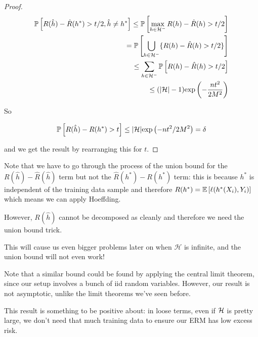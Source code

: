 \documentclass[11pt]{scrartcl}
\begin{document}
\begin{theorem}
\begin{proof}
\begin{align}
    \mathbb{P} \left[ R(\hat{h}) - \hat{R}(h^*) > t/2, \hat{h} \neq h^* \right] \le \mathbb{P} \left[ \max_{h \in \mathcal{H}^-} R(h) - \hat{R}(h) > t/2 \right] \\
    = \mathbb{P} \left[ \bigcup_{h \in \mathcal{H}^-} \{ R(h) - \hat{R}(h) > t/2 \} \right] \\
    \le \sum_{h \in \mathcal{H}^-} \mathbb{P} \left[ R(h) - \hat{R}(h) > t/2 \right] \\
    \le (|\mathcal{H}|-1) \text{exp} \left( -\frac{nt^2}{2M^2} \right)
\end{align}


So

\begin{equation}
    \mathbb{P} \left[ R(\hat{h}) - R(h^*) > t \right] \le |\mathcal{H}| \text{exp} \left( -nt^2 / 2M^2 \right) = \delta
\end{equation}

and we get the result by rearranging this for $t$.
\end{proof}
\label{Finite hypothesis class bound}
\end{theorem}

\begin{arthurnote*}
Note that we have to go through the process of the union bound for the $R(\hat{h})-\hat{R}(\hat{h})$ term but not the $\hat{R
}(h^*)-R(h^*)$ term: this is because $h^*$ is independent of the training data sample and therefore $R(h^*) = \mathbb{E} \left[  \ell ( h^*(X_i) , Y_i )  \right]$ which means we can apply Hoeffding.

However, $R(\hat{h})$ cannot be decomposed as cleanly and therefore we need the union bound trick.

This will cause us even bigger problems later on when $\mathcal{H}$ is infinite, and the union bound will not even work!
\end{arthurnote*}

Note that a similar bound could be found by applying the central limit theorem, since our setup involves a bunch of iid random variables. However, our result is not asymptotic, unlike the limit theorems we've seen before.

This result is something to be positive about: in loose terms, even if $\mathcal{H}$ is pretty large, we don't need that much training data to ensure our ERM has low excess risk.
\end{document}
